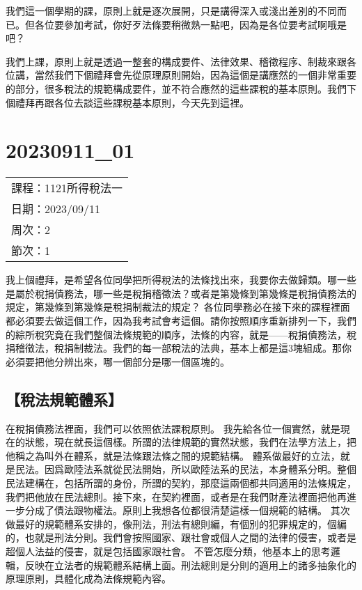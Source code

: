 \documentclass[]{ctexbook}
\begin{document}
我們這一個學期的課，原則上就是逐次展開，只是講得深入或淺出差別的不同而已。但各位要參加考試，你好歹法條要稍微熟一點吧，因為是各位要考試啊哦是吧？

我們上課，原則上就是透過一整套的構成要件、法律效果、稽徵程序、制裁來跟各位講，當然我們下個禮拜會先從原理原則開始，因為這個是講應然的一個非常重要的部分，很多稅法的規範構成要件，並不符合應然的這些課稅的基本原則。我們下個禮拜再跟各位去談這些課稅基本原則，今天先到這裡。

\hypertarget{section-2}{%
\chapter{20230911\_01}\label{section-2}}

\begin{longtable}[]{@{}l@{}}
\toprule()
\endhead
課程：1121所得稅法一 \\
日期：2023/09/11 \\
周次：2 \\
節次：1 \\
\bottomrule()
\end{longtable}

我上個禮拜，是希望各位同學把所得稅法的法條找出來，我要你去做歸類。哪一些是屬於稅捐債務法，哪一些是稅捐稽徵法？或者是第幾條到第幾條是稅捐債務法的規定，第幾條到第幾條是稅捐制裁法的規定？
各位同學務必在接下來的課程裡面都必須要去做這個工作，因為我考試會考這個。請你按照順序重新排列一下，我們的綜所稅究竟在我們整個法條規範的順序，法條的内容，就是------稅捐債務法，稅捐稽徵法，稅捐制裁法。我們的每一部稅法的法典，基本上都是這3塊組成。那你必須要把他分辨出來，哪一個部分是哪一個區塊的。

\hypertarget{ux7a05ux6cd5ux898fux7bc4ux9ad4ux7cfb}{%
\section{【稅法規範體系】}\label{ux7a05ux6cd5ux898fux7bc4ux9ad4ux7cfb}}

在稅捐債務法裡面，我們可以依照依法課稅原則。
我先給各位一個實然，就是現在的狀態，現在就長這個樣。所謂的法律規範的實然狀態，我們在法學方法上，把他稱之為叫外在體系，就是法條跟法條之間的規範結構。
體系做最好的立法，就是民法。因爲歐陸法系就從民法開始，所以歐陸法系的民法，本身體系分明。整個民法建構在，包括所謂的身份，所謂的契約，那麼這兩個都共同適用的法條規定，我們把他放在民法總則。接下來，在契約裡面，或者是在我們財產法裡面把他再進一步分成了債法跟物權法。原則上我想各位都很清楚這樣一個規範的結構。
其次做最好的規範體系安排的，像刑法，刑法有總則編，有個別的犯罪規定的，個編的，也就是刑法分則。我們會按照國家、跟社會或個人之間的法律的侵害，或者是超個人法益的侵害，就是包括國家跟社會。
不管怎麼分類，他基本上的思考邏輯，反映在立法者的規範體系結構上面。刑法總則是分則的適用上的諸多抽象化的原理原則，具體化成為法條規範內容。
\end{document}
